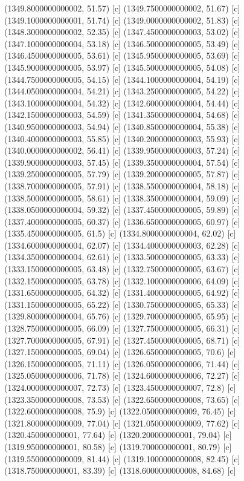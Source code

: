 {{{(1349.8000000000002, 51.57) [c] 
(1349.7500000000002, 51.67) [c] 
(1349.1000000000001, 51.74) [c] 
(1349.0000000000002, 51.83) [c] 
(1348.3000000000002, 52.35) [c] 
(1347.4500000000003, 53.02) [c] 
(1347.1000000000004, 53.18) [c] 
(1346.5000000000005, 53.49) [c] 
(1346.4500000000005, 53.61) [c] 
(1345.9500000000005, 53.69) [c] 
(1345.9000000000005, 53.97) [c] 
(1345.5000000000005, 54.08) [c] 
(1344.7500000000005, 54.15) [c] 
(1344.1000000000004, 54.19) [c] 
(1344.0500000000004, 54.21) [c] 
(1343.2500000000005, 54.22) [c] 
(1343.1000000000004, 54.32) [c] 
(1342.6000000000004, 54.44) [c] 
(1342.1500000000003, 54.59) [c] 
(1341.3500000000004, 54.68) [c] 
(1340.9500000000003, 54.94) [c] 
(1340.8500000000004, 55.38) [c] 
(1340.4000000000003, 55.85) [c] 
(1340.2000000000003, 55.93) [c] 
(1340.0000000000002, 56.41) [c] 
(1339.9500000000003, 57.24) [c] 
(1339.9000000000003, 57.45) [c] 
(1339.3500000000004, 57.54) [c] 
(1339.2500000000005, 57.79) [c] 
(1339.2000000000005, 57.87) [c] 
(1338.7000000000005, 57.91) [c] 
(1338.5500000000004, 58.18) [c] 
(1338.5000000000005, 58.61) [c] 
(1338.3500000000004, 59.09) [c] 
(1338.0500000000004, 59.32) [c] 
(1337.4500000000005, 59.89) [c] 
(1337.4000000000005, 60.37) [c] 
(1336.6500000000005, 60.97) [c] 
(1335.4500000000005, 61.5) [c] 
(1334.8000000000004, 62.02) [c] 
(1334.6000000000004, 62.07) [c] 
(1334.4000000000003, 62.28) [c] 
(1334.3500000000004, 62.61) [c] 
(1333.5000000000005, 63.33) [c] 
(1333.1500000000005, 63.48) [c] 
(1332.7500000000005, 63.67) [c] 
(1332.1500000000005, 63.78) [c] 
(1332.1000000000006, 64.09) [c] 
(1331.6500000000005, 64.32) [c] 
(1331.4000000000005, 64.92) [c] 
(1331.1500000000005, 65.22) [c] 
(1330.7500000000005, 65.33) [c] 
(1329.8000000000004, 65.76) [c] 
(1329.7000000000005, 65.95) [c] 
(1328.7500000000005, 66.09) [c] 
(1327.7500000000005, 66.31) [c] 
(1327.7000000000005, 67.91) [c] 
(1327.4500000000005, 68.71) [c] 
(1327.1500000000005, 69.04) [c] 
(1326.6500000000005, 70.6) [c] 
(1326.1500000000005, 71.11) [c] 
(1326.0500000000006, 71.44) [c] 
(1325.0500000000006, 71.78) [c] 
(1324.6000000000006, 72.27) [c] 
(1324.0000000000007, 72.73) [c] 
(1323.4500000000007, 72.8) [c] 
(1323.3500000000008, 73.53) [c] 
(1322.6500000000008, 73.65) [c] 
(1322.6000000000008, 75.9) [c] 
(1322.0500000000009, 76.45) [c] 
(1321.8000000000009, 77.04) [c] 
(1321.0500000000009, 77.62) [c] 
(1320.450000000001, 77.64) [c] 
(1320.200000000001, 79.04) [c] 
(1319.950000000001, 80.58) [c] 
(1319.700000000001, 80.79) [c] 
(1319.5500000000009, 81.44) [c] 
(1319.1000000000008, 82.45) [c] 
(1318.750000000001, 83.39) [c] 
(1318.6000000000008, 84.68) [c] 
}}}
